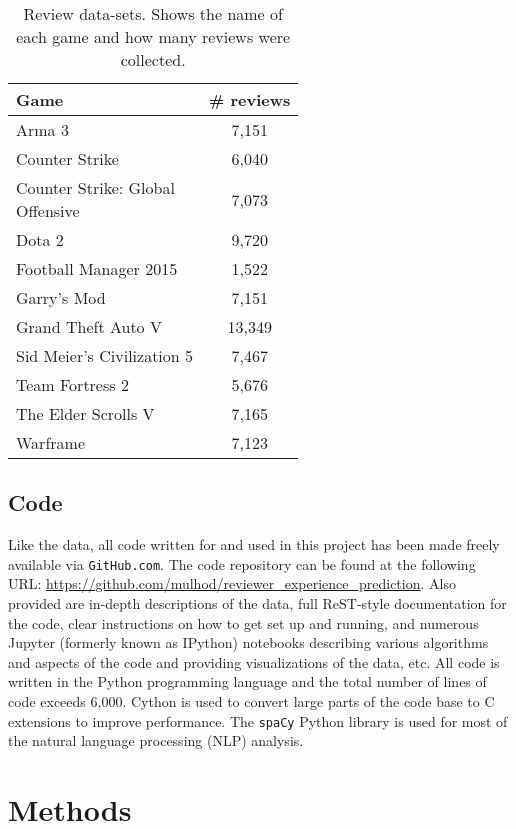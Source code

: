 \documentclass[9pt]{article}
\begin{document}
\begin{table}[ht]
\centering
\renewcommand{\arraystretch}{1.2}
\begin{tabular}{|l|c|}
\hline \bf Game & \bf \# reviews \\ \hline
Arma 3 & 7,151 \\
Counter Strike & 6,040 \\
\parbox[t]{4cm}{Counter Strike: Global\\Offensive} & 7,073 \\
Dota 2 & 9,720 \\
Football Manager 2015 & 1,522 \\
Garry's Mod & 7,151 \\
Grand Theft Auto V & 13,349 \\
Sid Meier's Civilization 5 & 7,467 \\
Team Fortress 2 & 5,676 \\
The Elder Scrolls V & 7,165 \\
Warframe & 7,123 \\ \hline
\end{tabular}
\caption{Review data-sets. Shows the name of each game and how many reviews were collected.}
\label{tab:datasets}
\end{table}

\subsection{Code}

Like the data, all code written for and used in this project has been made freely available via {\tt GitHub.com}. The code repository can be found at the following URL: \url{https://github.com/mulhod/reviewer_experience_prediction}. Also provided are in-depth descriptions of the data, full ReST-style documentation for the code, clear instructions on how to get set up and running, and numerous Jupyter (formerly known as IPython) notebooks describing various algorithms and aspects of the code and providing visualizations of the data, etc. All code is written in the Python programming language and the total number of lines of code exceeds 6,000. Cython is used to convert large parts of the code base to C extensions to improve performance. The {\tt spaCy} Python library is used for most of the natural language processing (NLP) analysis.

\section{Methods}
\end{document}
